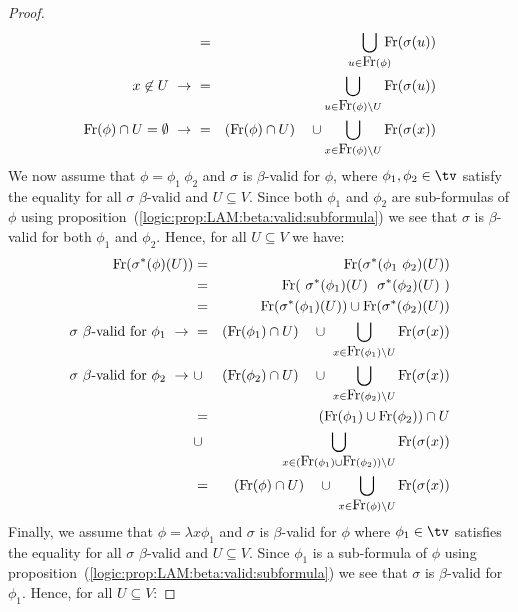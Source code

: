 \begin{proof}
\begin{eqnarray*}
        &=&
        \!\!\!\!\!
        \bigcup_{u\in\free(\phi)} 
        \!\!\!\!
        \free(\sigma(u))\\
        \mbox{$x\not\in U\ \rightarrow\ $}&=&\bigcup_{u\in\free(\phi)\setminus U} 
            \free(\sigma(u))\\
        \mbox{$\free(\phi)\cap U = \emptyset\ \rightarrow\ $} &=& 
            (\free(\phi)\cap U)\ \ \ \cup
            \bigcup_{x\in\free(\phi)\setminus U} \free(\sigma(x))
    \end{eqnarray*}
We now assume that $\phi=\phi_{1}\ \phi_{2}$ and $\sigma$ is $\beta$-valid 
for $\phi$, where $\phi_{1}, \phi_{2}\in\tv$ satisfy the equality for all 
$\sigma$ $\beta$-valid and $U\subseteq V$. Since both $\phi_{1}$ and $\phi_{2}$ 
are sub-formulas of $\phi$ using  
proposition~(\ref{logic:prop:LAM:beta:valid:subformula}) we see that $\sigma$
is $\beta$-valid for both $\phi_{1}$ and $\phi_{2}$. Hence, for all 
$U\subseteq V$ we have:
    \begin{eqnarray*}
        \free(\sigma^{*}(\phi)(U))
        &=&\free(\sigma^{*}(\phi_{1}\ \phi_{2})(U))\\
        &=&\free(\ \sigma^{*}(\phi_{1})(U)\ \ \sigma^{*}(\phi_{2})(U)\ )\\
        &=&\free(\sigma^{*}(\phi_{1})(U))\cup\free(\sigma^{*}(\phi_{2})(U))\\
        \mbox{$\sigma$ $\beta$-valid for $\phi_{1}\ \rightarrow\ $}
        &=&(\free(\phi_{1})\cap U)\ \ \ \cup\ 
            \bigcup_{x\in\free(\phi_{1})\setminus U} \free(\sigma(x))\\
        \mbox{$\sigma$ $\beta$-valid for $\phi_{2}\ \rightarrow\ $}
        &\cup&(\free(\phi_{2})\cap U)\ \ \ \cup\ 
            \bigcup_{x\in\free(\phi_{2})\setminus U} \free(\sigma(x))\\
        &=&(\free(\phi_{1})\cup\free(\phi_{2}))\cap U\\
        &\cup&\bigcup_{x\in(\free(\phi_{1})\cup\free(\phi_{2}))\setminus U}
            \free(\sigma(x))\\
        &=&(\free(\phi)\cap U)\ \ \ \cup\ \bigcup_{x\in\free(\phi)\setminus U}
            \free(\sigma(x))
    \end{eqnarray*}
Finally, we assume that $\phi=\lambda x\phi_{1}$ and $\sigma$ is $\beta$-valid
for $\phi$ where $\phi_{1}\in\tv$ satisfies the equality for all $\sigma$
$\beta$-valid and $U\subseteq V$. Since $\phi_{1}$ is a sub-formula of $\phi$
using proposition~(\ref{logic:prop:LAM:beta:valid:subformula}) we see that 
    $\sigma$ is $\beta$-valid for $\phi_{1}$. Hence, for all $U\subseteq V$:

\end{proof}
